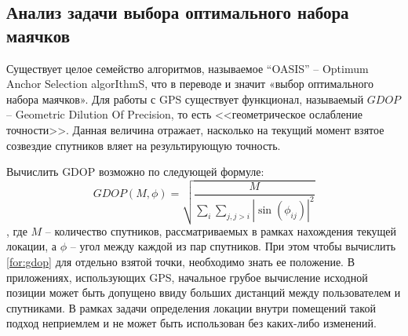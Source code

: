\subsection{Анализ задачи выбора оптимального набора маячков}

Существует целое семейство алгоритмов, называемое “OASIS” – Optimum Anchor Selection algorIthmS, что в переводе и значит «выбор оптимального набора маячков». Для работы с GPS существует функционал, называемый $GDOP$ – Geometric Dilution Of Precision, то есть <<геометрическое ослабление точности>>. Данная величина отражает, насколько на текущий момент взятое созвездие спутников вляет на результирующую точность.

Вычислить GDOP возможно по следующей формуле:
\begin{equation} \label{for:gdop}
    GDOP(M, \phi)=\sqrt{ \frac{M}{\sum_i\sum_{j,j>i}|\sin(\phi_{ij})|^2} }
\end{equation}
, где $M$ – количество спутников, рассматриваемых в рамках нахождения текущей локации, а $\phi$ – угол между каждой из пар спутников. При этом чтобы вычислить \ref{for:gdop} для отдельно взятой точки, необходимо знать ее положение. В приложениях, использующих GPS, начальное грубое вычисление исходной позиции может быть допущено ввиду больших дистанций между пользователем и спутниками. В рамках задачи определения локации внутри помещений такой подход неприемлем и не может быть использован без каких-либо изменений.

